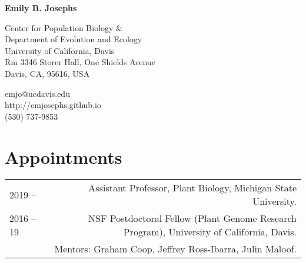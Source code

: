 \documentclass[letterpaper]{article}
\def\name{Emily B. Josephs}
\begin{document}
{\huge\textbf{\name}}
\vspace{0.1in}

\begin{minipage}{0.55\linewidth}
Center for Population Biology \& \\
Department of Evolution and Ecology\\
University of California, Davis \\
Rm 3346 Storer Hall, One Shields Avenue \\
Davis, CA, 95616, USA \\
\end{minipage}
\begin{minipage}{0.35\textwidth}
emjo@ucdavis.edu \\
http://emjosephs.github.io \\
(530) 737-9853 \\

\end{minipage}
\section*{Appointments}
\begin{tabular}{LR}
 2019 --   & Assistant Professor, Plant Biology, Michigan State University. \\[0.5ex]
  2016 -- 19     & NSF Postdoctoral Fellow (Plant Genome Research Program), University of California, Davis.\\
  & Mentors: Graham Coop, Jeffrey Ross-Ibarra, Julin Maloof.\\ [0.5ex]
\end{tabular}
\end{document}
